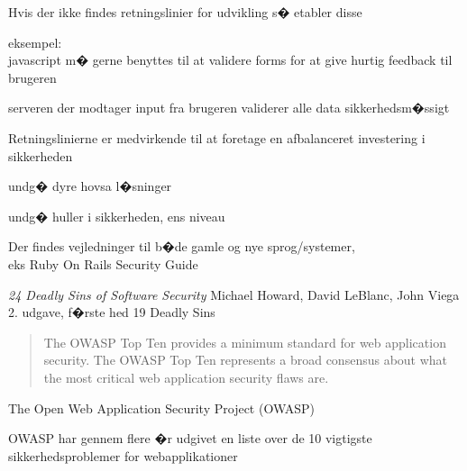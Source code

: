 \documentclass[20pt,landscape,a4paper,footrule]{foils}
\begin{document}

\begin{list2}
\item Hvis der ikke findes retningslinier for udvikling s� etabler disse
\item eksempel:\\
javascript m� gerne benyttes til at validere forms for at give hurtig
feedback til brugeren
\item serveren der modtager input fra brugeren validerer alle data
  sikkerhedsm�ssigt
\item Retningslinierne er medvirkende til at foretage
en afbalanceret investering i sikkerheden
\item undg� dyre hovsa l�sninger
\item undg� huller i sikkerheden, ens niveau

\item Der findes vejledninger til b�de gamle og nye sprog/systemer, \\
eks Ruby On Rails Security Guide
\end{list2}





\begin{list1}
\item \emph{24 Deadly Sins of Software Security}
Michael Howard, David LeBlanc, John Viega 2. udgave, f�rste hed 19 Deadly Sins
\end{list1}



\begin{quote}
The OWASP Top Ten provides a minimum standard for web application
security. The OWASP Top Ten represents a broad consensus about what
the most critical web application security flaws are.
\end{quote}

\begin{list1}
\item The Open Web Application Security Project (OWASP)
\item OWASP har gennem flere �r udgivet en liste over de 10 vigtigste
  sikkerhedsproblemer for webapplikationer
\item {}
\end{list1}
\end{document}
